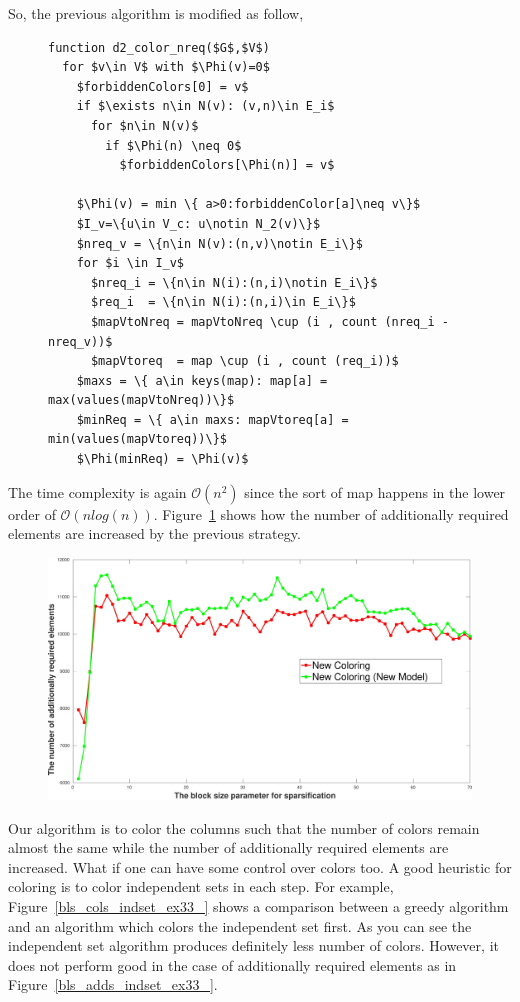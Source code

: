 \documentclass[12pt, oneside]{book}
\newcommand{\figref}[1]{Figure~\protect\ref{#1}}
\begin{document}
So, the previous algorithm is modified as follow,
\begin{figure}
\begin{lstlisting}[caption=New coloring heuristc increasing the number of additionally required elements.,label=code.new.impr1,mathescape]
function d2_color_nreq($G$,$V$)
  for $v\in V$ with $\Phi(v)=0$
    $forbiddenColors[0] = v$
    if $\exists n\in N(v): (v,n)\in E_i$ 
      for $n\in N(v)$
        if $\Phi(n) \neq 0$
          $forbiddenColors[\Phi(n)] = v$

    $\Phi(v) = min \{ a>0:forbiddenColor[a]\neq v\}$
    $I_v=\{u\in V_c: u\notin N_2(v)\}$
    $nreq_v = \{n\in N(v):(n,v)\notin E_i\}$
    for $i \in I_v$
      $nreq_i = \{n\in N(i):(n,i)\notin E_i\}$
      $req_i  = \{n\in N(i):(n,i)\in E_i\}$ 
      $mapVtoNreq = mapVtoNreq \cup (i , count (nreq_i - nreq_v))$
      $mapVtoreq  = map \cup (i , count (req_i))$
    $maxs = \{ a\in keys(map): map[a] = max(values(mapVtoNreq))\}$
    $minReq = \{ a\in maxs: mapVtoreq[a] = min(values(mapVtoreq))\}$
    $\Phi(minReq) = \Phi(v)$
\end{lstlisting}
\end{figure}

The time complexity is again $\mathcal{O}(n^2)$ since the sort of map happens in the lower order of 
$\mathcal{O}(nlog(n))$. 
\figref{bls_add_ex33_compare_max} shows how the number of additionally required elements are increased
by the previous strategy.
\begin{figure}
\centering
\includegraphics[width=0.9\linewidth]{bls_add_ex33_compare_max}
\label{bls_add_ex33_compare_max}
\end{figure}

Our algorithm is to color the columns such that the number of colors
remain almost the same while the number of additionally required elements are increased.
What if one can have some control over colors too. 
A good heuristic for coloring is to color independent sets in each step.
For example, \figref{bls_cols_indset_ex33_} shows a comparison between a greedy algorithm and
an algorithm which colors the independent set first. As you can see the independent set algorithm
produces definitely less number of colors. However, it does not perform good in the case of additionally
required elements as in \figref{bls_adds_indset_ex33_}.
\end{document}
